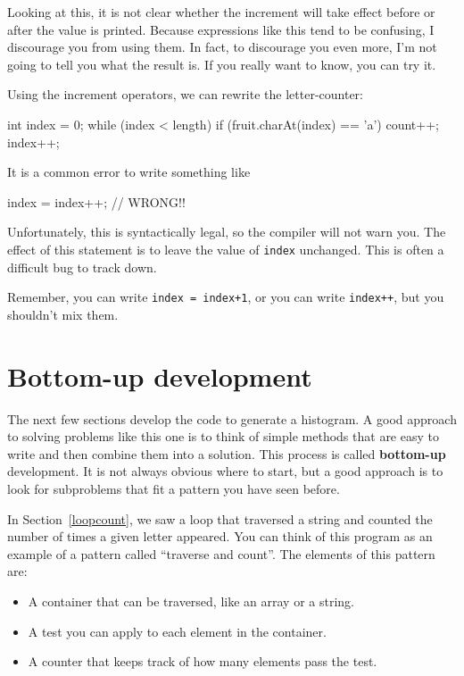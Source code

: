 Looking at this, it is not clear whether the increment will take effect before or after the value is printed.
Because expressions like this tend to be confusing, I discourage you from using them.
In fact, to discourage you even more, I'm not going to tell you what the result is.
If you really want to know, you can try it.

Using the increment operators, we can rewrite the letter-counter:

\begin{code}
int index = 0;
while (index < length) {
    if (fruit.charAt(index) == 'a') {
        count++;
    }
    index++;
}
\end{code}

It is a common error to write something like

\begin{code}
index = index++;             // WRONG!!
\end{code}

Unfortunately, this is syntactically legal, so the compiler will not warn you.
The effect of this statement is to leave the value of {\tt index} unchanged.
This is often a difficult bug to track down.

Remember, you can write {\tt index = index+1}, or you can write {\tt index++}, but you shouldn't mix them.


\section{Bottom-up development}


The next few sections develop the code to generate a histogram.
A good approach to solving problems like this one is to think of simple methods that are easy to write and then combine them into a solution.
This process is called {\bf bottom-up} development.
It is not always obvious where to start, but a good approach is to look for subproblems that fit a pattern you have seen before.


In Section~\ref{loopcount}, we saw a loop that traversed a string and counted the number of times a given letter appeared.
You can think of this program as an example of a pattern called ``traverse and count''.
The elements of this pattern are:

\begin{itemize}
\item A container that can be traversed, like an array or a string.
\item A test you can apply to each element in the container.
\item A counter that keeps track of how many elements pass the test.
\end{itemize}

